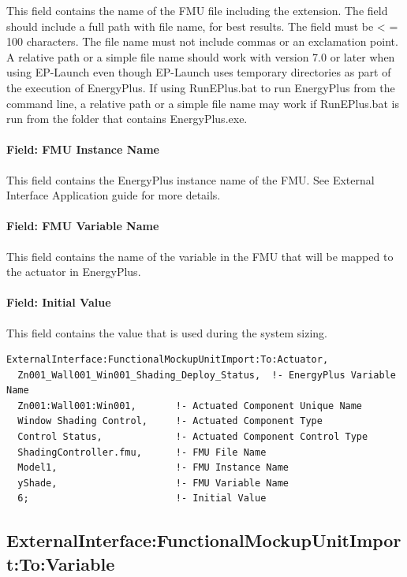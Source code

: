 This field contains the name of the FMU file including the extension. The field should include a full path with file name, for best results. The field must be \textless{} = 100 characters. The file name must not include commas or an exclamation point. A relative path or a simple file name should work with version 7.0 or later when using EP-Launch even though EP-Launch uses temporary directories as part of the execution of EnergyPlus. If using RunEPlus.bat to run EnergyPlus from the command line, a relative path or a simple file name may work if RunEPlus.bat is run from the folder that contains EnergyPlus.exe.

\paragraph{Field: FMU Instance Name}\label{field-fmu-instance-name-2}

This field contains the EnergyPlus instance name of the FMU. See External Interface Application guide for more details.

\paragraph{Field: FMU Variable Name}\label{field-fmu-variable-name-2}

This field contains the name of the variable in the FMU that will be mapped to the actuator in EnergyPlus.

\paragraph{Field: Initial Value}\label{field-initial-value-4}

This field contains the value that is used during the system sizing.

\begin{lstlisting}
ExternalInterface:FunctionalMockupUnitImport:To:Actuator,
  Zn001_Wall001_Win001_Shading_Deploy_Status,  !- EnergyPlus Variable Name
  Zn001:Wall001:Win001,       !- Actuated Component Unique Name
  Window Shading Control,     !- Actuated Component Type
  Control Status,             !- Actuated Component Control Type
  ShadingController.fmu,      !- FMU File Name
  Model1,                     !- FMU Instance Name
  yShade,                     !- FMU Variable Name
  6;                          !- Initial Value
\end{lstlisting}

\subsection{ExternalInterface:FunctionalMockupUnitImport:To:Variable}\label{externalinterfacefunctionalmockupunitimporttovariable}

